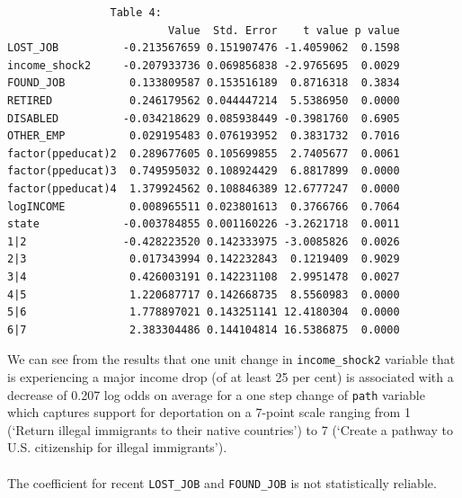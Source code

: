 \documentclass[12pt,letterpaper]{article}
\begin{document}
\begin{Verbatim}
				Table 4:
                         Value  Std. Error    t value p value
LOST_JOB          -0.213567659 0.151907476 -1.4059062  0.1598
income_shock2     -0.207933736 0.069856838 -2.9765695  0.0029
FOUND_JOB          0.133809587 0.153516189  0.8716318  0.3834
RETIRED            0.246179562 0.044447214  5.5386950  0.0000
DISABLED          -0.034218629 0.085938449 -0.3981760  0.6905
OTHER_EMP          0.029195483 0.076193952  0.3831732  0.7016
factor(ppeducat)2  0.289677605 0.105699855  2.7405677  0.0061
factor(ppeducat)3  0.749595032 0.108924429  6.8817899  0.0000
factor(ppeducat)4  1.379924562 0.108846389 12.6777247  0.0000
logINCOME          0.008965511 0.023801613  0.3766766  0.7064
state             -0.003784855 0.001160226 -3.2621718  0.0011
1|2               -0.428223520 0.142333975 -3.0085826  0.0026
2|3                0.017343994 0.142232843  0.1219409  0.9029
3|4                0.426003191 0.142231108  2.9951478  0.0027
4|5                1.220687717 0.142668735  8.5560983  0.0000
5|6                1.778897021 0.143251141 12.4180304  0.0000
6|7                2.383304486 0.144104814 16.5386875  0.0000
\end{Verbatim}
We can see from the results that one unit change in \texttt{income\_shock2} variable that is experiencing a major income drop (of at least 25 per cent) is associated with a decrease of 0.207 log odds on average for a one step change of \texttt{path} variable which captures support for deportation on a 7-point scale ranging from 1 (‘Return illegal immigrants to their native countries’) to 7 (‘Create a pathway to U.S. citizenship for illegal immigrants’).\\
\\The coefficient for recent \texttt{LOST\_JOB} and \texttt{FOUND\_JOB} is not statistically reliable.\\

\pagebreak
\end{document}
